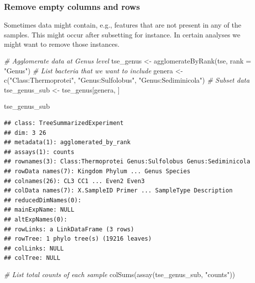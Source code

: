 \documentclass[
]{book}
\newenvironment{Shaded}{\begin{snugshade}}{\end{snugshade}}
\newcommand{\AttributeTok}[1]{\textcolor[rgb]{0.77,0.63,0.00}{#1}}
\newcommand{\CommentTok}[1]{\textcolor[rgb]{0.56,0.35,0.01}{\textit{#1}}}
\newcommand{\FunctionTok}[1]{\textcolor[rgb]{0.00,0.00,0.00}{#1}}
\newcommand{\NormalTok}[1]{#1}
\newcommand{\OtherTok}[1]{\textcolor[rgb]{0.56,0.35,0.01}{#1}}
\newcommand{\StringTok}[1]{\textcolor[rgb]{0.31,0.60,0.02}{#1}}
\begin{document}
\hypertarget{remove-empty-columns-and-rows}{%
\subsubsection{Remove empty columns and rows}\label{remove-empty-columns-and-rows}}

Sometimes data might contain, e.g., features that are not present in any of the samples.
This might occur after subsetting for instance. In certain analyses we might want to
remove those instances.

\begin{Shaded}
\begin{Highlighting}[]
\CommentTok{\# Agglomerate data at Genus level }
\NormalTok{tse\_genus }\OtherTok{\textless{}{-}} \FunctionTok{agglomerateByRank}\NormalTok{(tse, }\AttributeTok{rank =} \StringTok{"Genus"}\NormalTok{)}
\CommentTok{\# List bacteria that we want to include}
\NormalTok{genera }\OtherTok{\textless{}{-}} \FunctionTok{c}\NormalTok{(}\StringTok{"Class:Thermoprotei"}\NormalTok{, }\StringTok{"Genus:Sulfolobus"}\NormalTok{, }\StringTok{"Genus:Sediminicola"}\NormalTok{)}
\CommentTok{\# Subset data}
\NormalTok{tse\_genus\_sub }\OtherTok{\textless{}{-}}\NormalTok{ tse\_genus[genera, ]}

\NormalTok{tse\_genus\_sub}
\end{Highlighting}
\end{Shaded}

\begin{verbatim}
## class: TreeSummarizedExperiment 
## dim: 3 26 
## metadata(1): agglomerated_by_rank
## assays(1): counts
## rownames(3): Class:Thermoprotei Genus:Sulfolobus Genus:Sediminicola
## rowData names(7): Kingdom Phylum ... Genus Species
## colnames(26): CL3 CC1 ... Even2 Even3
## colData names(7): X.SampleID Primer ... SampleType Description
## reducedDimNames(0):
## mainExpName: NULL
## altExpNames(0):
## rowLinks: a LinkDataFrame (3 rows)
## rowTree: 1 phylo tree(s) (19216 leaves)
## colLinks: NULL
## colTree: NULL
\end{verbatim}

\begin{Shaded}
\begin{Highlighting}[]
\CommentTok{\# List total counts of each sample}
\FunctionTok{colSums}\NormalTok{(}\FunctionTok{assay}\NormalTok{(tse\_genus\_sub, }\StringTok{"counts"}\NormalTok{))}
\end{Highlighting}
\end{Shaded}
\end{document}
